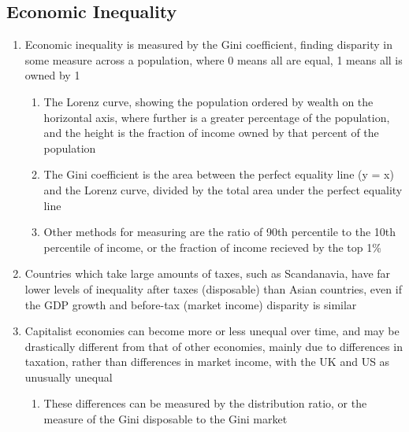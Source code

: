 \subsection{Economic Inequality}
\begin{enumerate}
\item Economic inequality is measured by the Gini coefficient, finding disparity in some measure across a population, where 0 means all are equal, 1 means all is owned by 1
\begin{enumerate}
\item The Lorenz curve, showing the population ordered by wealth on the horizontal axis, where further is a greater percentage of the population, and the height is the fraction of income owned by that percent of the population
\item The Gini coefficient is the area between the perfect equality line (y = x) and the Lorenz curve, divided by the total area under the perfect equality line
\item Other methods for measuring are the ratio of 90th percentile to the 10th percentile of income, or the fraction of income recieved by the top 1\%
\end{enumerate}
\item Countries which take large amounts of taxes, such as Scandanavia, have far lower levels of inequality after taxes (disposable) than Asian countries, even if the GDP growth and before-tax (market income) disparity is similar
\item Capitalist economies can become more or less unequal over time, and may be drastically different from that of other economies, mainly due to differences in taxation, rather than differences in market income, with the UK and US as unusually unequal
\begin{enumerate}
\item These differences can be measured by the distribution ratio, or the measure of the Gini disposable to the Gini market
\end{enumerate}
\end{enumerate}

